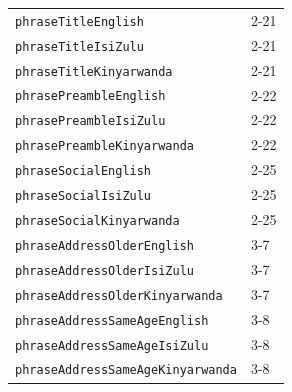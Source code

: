 \documentclass{CSSRforAfrica}
\begin{document}
\begin{table}[H]
\begin{center}
\begin{tabular}{|l l|}
{\footnotesize \verb+phraseTitleEnglish+} 	           & {\footnotesize 2-21} \vspace{-1mm}\\
{\footnotesize \verb+phraseTitleIsiZulu+} 	           & {\footnotesize 2-21} \vspace{-1mm}\\
{\footnotesize \verb+phraseTitleKinyarwanda+} 	           & {\footnotesize 2-21} \vspace{-1mm}\\
{\footnotesize \verb+phrasePreambleEnglish+} 	           & {\footnotesize 2-22 } \vspace{-1mm}\\
{\footnotesize \verb+phrasePreambleIsiZulu+} 	           & {\footnotesize 2-22 } \vspace{-1mm}\\
{\footnotesize \verb+phrasePreambleKinyarwanda+} 	           & {\footnotesize 2-22 } \vspace{-1mm}\\
{\footnotesize \verb+phraseSocialEnglish+} 	           & {\footnotesize  2-25} \vspace{-1mm}\\
{\footnotesize \verb+phraseSocialIsiZulu+} 	           & {\footnotesize  2-25} \vspace{-1mm}\\
{\footnotesize \verb+phraseSocialKinyarwanda+} 	           & {\footnotesize  2-25} \vspace{-1mm}\\
{\footnotesize \verb+phraseAddressOlderEnglish+} 	           & {\footnotesize  3-7} \vspace{-1mm}\\
{\footnotesize \verb+phraseAddressOlderIsiZulu+} 	           & {\footnotesize  3-7} \vspace{-1mm}\\
{\footnotesize \verb+phraseAddressOlderKinyarwanda+} 	           & {\footnotesize  3-7} \vspace{-1mm}\\
{\footnotesize \verb+phraseAddressSameAgeEnglish+} 	           & {\footnotesize 3-8} \vspace{-1mm}\\
{\footnotesize \verb+phraseAddressSameAgeIsiZulu+} 	           & {\footnotesize 3-8} \vspace{-1mm}\\
{\footnotesize \verb+phraseAddressSameAgeKinyarwanda+} 	           & {\footnotesize 3-8} \vspace{-1mm}\\

\end{tabular}
\end{center}
\end{table}
\end{document}
